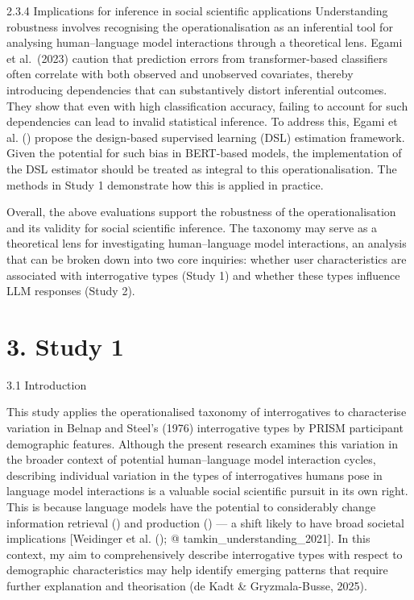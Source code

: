\documentclass[
  12pt,
]{article}
\begin{document}
2.3.4 Implications for inference in social scientific applications
Understanding robustness involves recognising the operationalisation as an inferential tool for analysing human--language model interactions through a theoretical lens. Egami et al.~(2023) caution that prediction errors from transformer-based classifiers often correlate with both observed and unobserved covariates, thereby introducing dependencies that can substantively distort inferential outcomes. They show that even with high classification accuracy, failing to account for such dependencies can lead to invalid statistical inference. To address this, Egami et al. () propose the design-based supervised learning (DSL) estimation framework. Given the potential for such bias in BERT-based models, the implementation of the DSL estimator should be treated as integral to this operationalisation. The methods in Study 1 demonstrate how this is applied in practice.

Overall, the above evaluations support the robustness of the operationalisation and its validity for social scientific inference. The taxonomy may serve as a theoretical lens for investigating human--language model interactions, an analysis that can be broken down into two core inquiries: whether user characteristics are associated with interrogative types (Study 1) and whether these types influence LLM responses (Study 2).

\section{3. Study 1}\label{study-1}

3.1 Introduction

This study applies the operationalised taxonomy of interrogatives to characterise variation in Belnap and Steel's (1976) interrogative types by PRISM participant demographic features. Although the present research examines this variation in the broader context of potential human--language model interaction cycles, describing individual variation in the types of interrogatives humans pose in language model interactions is a valuable social scientific pursuit in its own right. This is because language models have the potential to considerably change information retrieval () and production () --- a shift likely to have broad societal implications {[}Weidinger et al. (); @ tamkin\_understanding\_2021{]}. In this context, my aim to comprehensively describe interrogative types with respect to demographic characteristics may help identify emerging patterns that require further explanation and theorisation (de Kadt \& Gryzmala-Busse, 2025).
\end{document}
